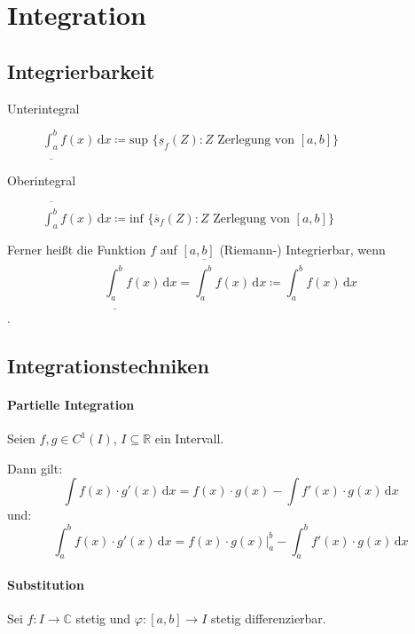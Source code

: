     \section{Integration}
        \subsection{Integrierbarkeit}
            \begin{description}
                \item[Unterintegral] $ \underline{\int _ a ^ b} \! f(x) \, \mathrm{d}x \coloneqq \text{sup } \{ \underline{s} _ f (Z) : Z \text{ Zerlegung von } [a, b] \} $
                \item[Oberintegral] $ \overline{\int _ a ^ b} \! f(x) \, \mathrm{d}x \coloneqq \text{inf } \{ \overline{s} _ f (Z) : Z \text{ Zerlegung von } [a, b] \} $
            \end{description}

            Ferner heißt die Funktion $ f $ auf $ [a, b] $ (Riemann-) Integrierbar, wenn \[ \underline{\int _ a ^ b} \! f(x) \, \mathrm{d}x = \overline{\int _ a ^ b} \! f(x) \, \mathrm{d}x \coloneqq \int _ a ^ b \! f(x) \, \mathrm{d}x \].

        \subsection{Integrationstechniken}
            \paragraph{Partielle Integration}
                Seien $ f, g \in C ^ 1 (I) $, $ I \subseteq \mathbb{R} $ ein Intervall.

                Dann gilt:
                \begin{equation*}
                    \int \! f(x) \cdot g'(x) \, \mathrm{d}x = f(x) \cdot g(x) - \int \! f'(x) \cdot g(x) \, \mathrm{d}x
                \end{equation*}
                und:
                \begin{equation*}
                    \int _ a ^ b \! f(x) \cdot g'(x) \, \mathrm{d}x = f(x) \cdot g(x) \Bigr| _ a ^ b - \int _ a ^ b \! f'(x) \cdot g(x) \, \mathrm{d}x
                \end{equation*}

            \paragraph{Substitution}
                Sei $ f : I \rightarrow \mathbb{C} $ stetig und $ \varphi : [a, b] \rightarrow I $ stetig differenzierbar.

